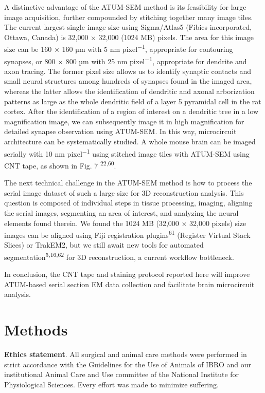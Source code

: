 \documentclass{article}
\begin{document}
A distinctive advantage of the ATUM-SEM method is its feasibility for large image acquisition, further compounded by stitching together many image tiles. The current largest single image size using Sigma/Atlas5 (Fibics incorporated, Ottawa, Canada) is 32,000 × 32,000 (1024 MB) pixels. The area for this image size can be 160 × 160 µm with 5 nm pixel\textsuperscript{−1}, appropriate for contouring synapses, or 800 × 800 µm with 25 nm pixel\textsuperscript{−1}, appropriate for dendrite and axon tracing. The former pixel size allows us to identify synaptic contacts and small neural structures among hundreds of synapses found in the imaged area, whereas the latter allows the identification of dendritic and axonal arborization patterns as large as the whole dendritic field of a layer 5 pyramidal cell in the rat cortex. After the identification of a region of interest on a dendritic tree in a low magnification image, we can subsequently image it in high magnification for detailed synapse observation using ATUM-SEM. In this way, microcircuit architecture can be systematically studied. A whole mouse brain can be imaged serially with 10 nm pixel\textsuperscript{−1} using stitched image tiles with ATUM-SEM using CNT tape, as shown in Fig. 7 \textsuperscript{22,60}.

The next technical challenge in the ATUM-SEM method is how to process the serial image dataset of such a large size for 3D reconstruction analysis. This question is composed of individual steps in tissue processing, imaging, aligning the serial images, segmenting an area of interest, and analyzing the neural elements found therein. We found the 1024 MB (32,000 × 32,000 pixels) size images can be aligned using Fiji registration plugins\textsuperscript{61} (Register Virtual Stack Slices) or TrakEM2, but we still await new tools for automated segmentation\textsuperscript{5,16,62} for 3D reconstruction, a current workflow bottleneck.

In conclusion, the CNT tape and staining protocol reported here will improve ATUM-based serial section EM data collection and facilitate brain microcircuit analysis.

\section*{Methods}

\textbf{Ethics statement}. All surgical and animal care methods were performed in strict accordance with the Guidelines for the Use of Animals of IBRO and our institutional Animal Care and Use committee of the National Institute for Physiological Sciences. Every effort was made to minimize suffering.
\end{document}
